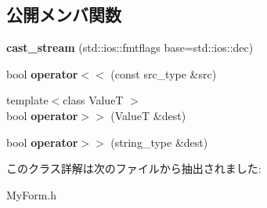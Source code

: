 \subsection*{公開メンバ関数}
\begin{DoxyCompactItemize}
\item 
\mbox{\label{class_project1_1_1_my_form_1_1clx_1_1cast__stream_a387f08a56ab764c21704f1ee8c21ae86}} 
{\bfseries cast\+\_\+stream} (std\+::ios\+::fmtflags base=std\+::ios\+::dec)
\item 
\mbox{\label{class_project1_1_1_my_form_1_1clx_1_1cast__stream_a0c73a6a819948c22efb053af7a7cf54d}} 
bool {\bfseries operator$<$$<$} (const src\+\_\+type \&src)
\item 
\mbox{\label{class_project1_1_1_my_form_1_1clx_1_1cast__stream_af016c1601747a5a98aaf73cab36e40e5}} 
{\footnotesize template$<$class ValueT $>$ }\\bool {\bfseries operator$>$$>$} (ValueT \&dest)
\item 
\mbox{\label{class_project1_1_1_my_form_1_1clx_1_1cast__stream_aaeaf3ceeb2ad1c037fc5f2a8c24f23d3}} 
bool {\bfseries operator$>$$>$} (string\+\_\+type \&dest)
\end{DoxyCompactItemize}


このクラス詳解は次のファイルから抽出されました\+:\begin{DoxyCompactItemize}
\item 
My\+Form.\+h\end{DoxyCompactItemize}
